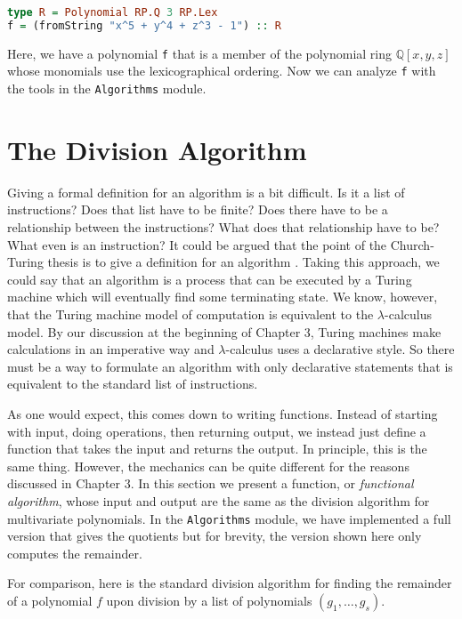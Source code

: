 \documentclass[MS, xcolor=dvipsnames]{wfuthesis}
\def\bQ{\mathbb{Q}}
\theoremstyle{definition}
\begin{document}
\begin{lstlisting}[language=Haskell]
type R = Polynomial RP.Q 3 RP.Lex
f = (fromString "x^5 + y^4 + z^3 - 1") :: R
\end{lstlisting}
Here, we have a polynomial \lstinline{f} that is a member of the polynomial ring $\bQ[x,y,z]$ whose monomials use the lexicographical ordering. Now we can analyze \lstinline{f} with the tools in the \lstinline{Algorithms} module.


\section{The Division Algorithm}
Giving a formal definition for an algorithm is a bit difficult. Is it a list of instructions? Does that list have to be finite? Does there have to be a relationship between the instructions? What does that relationship have to be? What even is an instruction? It could be argued that the point of the Church-Turing thesis is to give a definition for an algorithm \cite{Kleene1952}. Taking this approach, we could say that an algorithm is a process that can be executed by a Turing machine which will eventually find some terminating state. We know, however, that the Turing machine model of computation is equivalent to the $\lambda$-calculus model. By our discussion at the beginning of Chapter 3, Turing machines make calculations in an imperative way and $\lambda$-calculus uses a declarative style. So there must be a way to formulate an algorithm with only declarative statements that is equivalent to the standard list of instructions. \par
As one would expect, this comes down to writing functions. Instead of starting with input, doing operations, then returning output, we instead just define a function that takes the input and returns the output. In principle, this is the same thing. However, the mechanics can be quite different for the reasons discussed in Chapter 3. In this section we present a function, or \emph{functional algorithm}, whose input and output are the same as the division algorithm for multivariate polynomials. In the \lstinline{Algorithms} module, we have implemented a full version that gives the quotients but for brevity, the version shown here only computes the remainder. \par
For comparison, here is the standard division algorithm for finding the remainder of a polynomial $f$ upon division by a list of polynomials $(g_1,\dots,g_s)$. \par
\end{document}
